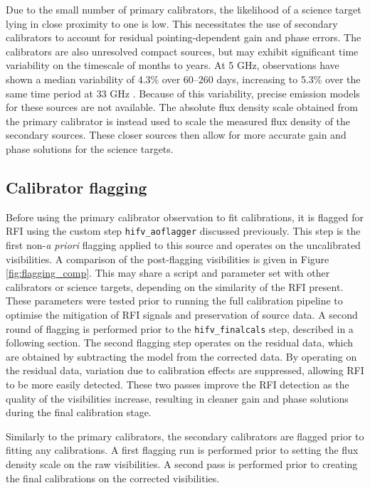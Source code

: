 Due to the small number of primary calibrators, the likelihood of a science target lying in close proximity to one is low. This necessitates the use of secondary calibrators to account for residual pointing-dependent gain and phase errors. The calibrators are also unresolved compact sources, but may exhibit significant time variability on the timescale of months to years. At 5 GHz, observations have shown a median variability of 4.3\% over 60--260 days, increasing to 5.3\% over the same time period at 33 GHz \citep{Kurinsky2013}. Because of this variability, precise emission models for these sources are not available. The absolute flux density scale obtained from the primary calibrator is instead used to scale the measured flux density of the secondary sources. These closer sources then allow for more accurate gain and phase solutions for the science targets.

\subsection{Calibrator flagging}
Before using the primary calibrator observation to fit calibrations, it is flagged for RFI using the custom step \texttt{hifv\_aoflagger} discussed previously. This step is the first non-\textit{a priori} flagging applied to this source and operates on the uncalibrated visibilities. A comparison of the post-flagging visibilities is given in Figure \ref{fig:flagging_comp}. This may share a script and parameter set with other calibrators or science targets, depending on the similarity of the RFI present. These parameters were tested prior to running the full calibration pipeline to optimise the mitigation of RFI signals and preservation of source data. A second round of flagging is performed prior to the \texttt{hifv\_finalcals} step, described in a following section. The second flagging step operates on the residual data, which are obtained by subtracting the model from the corrected data. By operating on the residual data, variation due to calibration effects are suppressed, allowing RFI to be more easily detected. These two passes improve the RFI detection as the quality of the visibilities increase, resulting in cleaner gain and phase solutions during the final calibration stage.

Similarly to the primary calibrators, the secondary calibrators are flagged prior to fitting any calibrations. A first flagging run is performed prior to setting the flux density scale on the raw visibilities. A second pass is performed prior to creating the final calibrations on the corrected visibilities.

